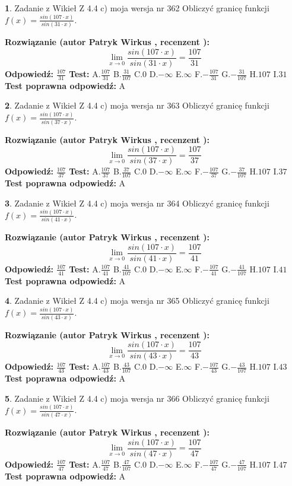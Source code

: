 \documentclass[12pt, a4paper]{article}
\theoremstyle{definition} %
\newtheorem{zad}{}
\newcommand{\zadStart}[1]{\begin{zad}#1\newline}
\newcommand{\zadStop}{\end{zad}}
\newcommand{\rozwStart}[2]{\noindent \textbf{Rozwiązanie (autor #1 , recenzent #2): }\newline}
\newcommand{\rozwStop}{\newline}
\newcommand{\odpStart}{\noindent \textbf{Odpowiedź:}\newline}
\newcommand{\odpStop}{\newline}
\newcommand{\testStart}{\noindent \textbf{Test:}\newline}
\newcommand{\testStop}{\newline}
\newcommand{\kluczStart}{\noindent \textbf{Test poprawna odpowiedź:}\newline}
\newcommand{\kluczStop}{\newline}
\begin{document}
\zadStart{Zadanie z Wikieł Z 4.4 c) moja wersja nr 362}
Obliczyć granicę funkcji $f(x)=\frac{sin(107\cdot x)}{sin(31\cdot x)}$.
\zadStop
\rozwStart{Patryk Wirkus}{}
$$\lim\limits_{x\to 0}\frac{sin(107\cdot x)}{sin(31\cdot x)}=
\frac{107}{31}$$
\rozwStop
\odpStart
$\frac{107}{31}$
\odpStop
\testStart
A.$\frac{107}{31}$
B.$\frac{31}{107}$
C.$0$
D.$-\infty$
E.$\infty$
F.$-\frac{107}{31}$
G.$-\frac{31}{107}$
H.$107$
I.$31$
\testStop
\kluczStart
A
\kluczStop



\zadStart{Zadanie z Wikieł Z 4.4 c) moja wersja nr 363}
Obliczyć granicę funkcji $f(x)=\frac{sin(107\cdot x)}{sin(37\cdot x)}$.
\zadStop
\rozwStart{Patryk Wirkus}{}
$$\lim\limits_{x\to 0}\frac{sin(107\cdot x)}{sin(37\cdot x)}=
\frac{107}{37}$$
\rozwStop
\odpStart
$\frac{107}{37}$
\odpStop
\testStart
A.$\frac{107}{37}$
B.$\frac{37}{107}$
C.$0$
D.$-\infty$
E.$\infty$
F.$-\frac{107}{37}$
G.$-\frac{37}{107}$
H.$107$
I.$37$
\testStop
\kluczStart
A
\kluczStop



\zadStart{Zadanie z Wikieł Z 4.4 c) moja wersja nr 364}
Obliczyć granicę funkcji $f(x)=\frac{sin(107\cdot x)}{sin(41\cdot x)}$.
\zadStop
\rozwStart{Patryk Wirkus}{}
$$\lim\limits_{x\to 0}\frac{sin(107\cdot x)}{sin(41\cdot x)}=
\frac{107}{41}$$
\rozwStop
\odpStart
$\frac{107}{41}$
\odpStop
\testStart
A.$\frac{107}{41}$
B.$\frac{41}{107}$
C.$0$
D.$-\infty$
E.$\infty$
F.$-\frac{107}{41}$
G.$-\frac{41}{107}$
H.$107$
I.$41$
\testStop
\kluczStart
A
\kluczStop



\zadStart{Zadanie z Wikieł Z 4.4 c) moja wersja nr 365}
Obliczyć granicę funkcji $f(x)=\frac{sin(107\cdot x)}{sin(43\cdot x)}$.
\zadStop
\rozwStart{Patryk Wirkus}{}
$$\lim\limits_{x\to 0}\frac{sin(107\cdot x)}{sin(43\cdot x)}=
\frac{107}{43}$$
\rozwStop
\odpStart
$\frac{107}{43}$
\odpStop
\testStart
A.$\frac{107}{43}$
B.$\frac{43}{107}$
C.$0$
D.$-\infty$
E.$\infty$
F.$-\frac{107}{43}$
G.$-\frac{43}{107}$
H.$107$
I.$43$
\testStop
\kluczStart
A
\kluczStop



\zadStart{Zadanie z Wikieł Z 4.4 c) moja wersja nr 366}
Obliczyć granicę funkcji $f(x)=\frac{sin(107\cdot x)}{sin(47\cdot x)}$.
\zadStop
\rozwStart{Patryk Wirkus}{}
$$\lim\limits_{x\to 0}\frac{sin(107\cdot x)}{sin(47\cdot x)}=
\frac{107}{47}$$
\rozwStop
\odpStart
$\frac{107}{47}$
\odpStop
\testStart
A.$\frac{107}{47}$
B.$\frac{47}{107}$
C.$0$
D.$-\infty$
E.$\infty$
F.$-\frac{107}{47}$
G.$-\frac{47}{107}$
H.$107$
I.$47$
\testStop
\kluczStart
A
\kluczStop
\end{document}
